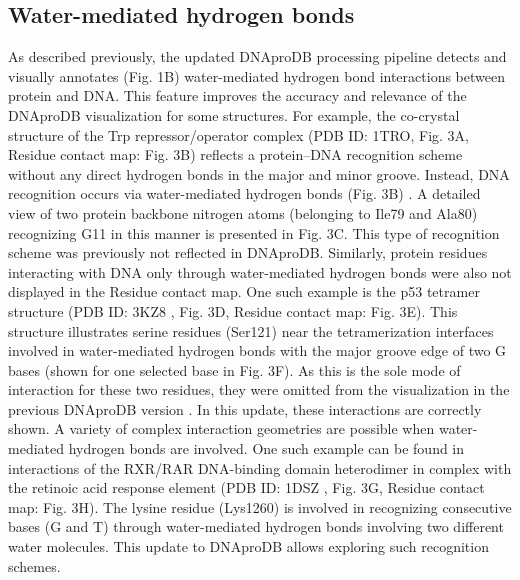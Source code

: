\subsection{Water-mediated hydrogen bonds}
As described previously, the updated DNAproDB processing pipeline detects and visually annotates (Fig. 1B) water-mediated hydrogen bond interactions between protein and DNA. This feature improves the accuracy and relevance of the DNAproDB visualization for some structures. For example, the co-crystal structure of the Trp repressor/operator complex (PDB ID: 1TRO, Fig. 3A, Residue contact map: Fig. 3B) reflects a protein–DNA recognition scheme without any direct hydrogen bonds in the major and minor groove. Instead, DNA recognition occurs via water-mediated hydrogen bonds (Fig. 3B) \citep{Otwinowski1988}. A detailed view of two protein backbone nitrogen atoms (belonging to Ile79 and Ala80) recognizing G11 in this manner is presented in Fig. 3C. This type of recognition scheme was previously not reflected in DNAproDB. Similarly, protein residues interacting with DNA only through water-mediated hydrogen bonds were also not displayed in the Residue contact map. One such example is the p53 tetramer structure (PDB ID: 3KZ8 \citep{Kitayner2010}, Fig. 3D, Residue contact map: Fig. 3E). This structure illustrates serine residues (Ser121) near the tetramerization interfaces involved in water-mediated hydrogen bonds with the major groove edge of two G bases (shown for one selected base in Fig. 3F). As this is the sole mode of interaction for these two residues, they were omitted from the visualization in the previous DNAproDB version \citep{Sagendorf2020}. In this update, these interactions are correctly shown. A variety of complex interaction geometries are possible when water-mediated hydrogen bonds are involved. One such example can be found in interactions of the RXR/RAR DNA-binding domain heterodimer in complex with the retinoic acid response element (PDB ID: 1DSZ \citep{Rastinejad2000}, Fig. 3G, Residue contact map: Fig. 3H). The lysine residue (Lys1260) is involved in recognizing consecutive bases (G and T) through water-mediated hydrogen bonds involving two different water molecules. This update to DNAproDB allows exploring such recognition schemes. 

